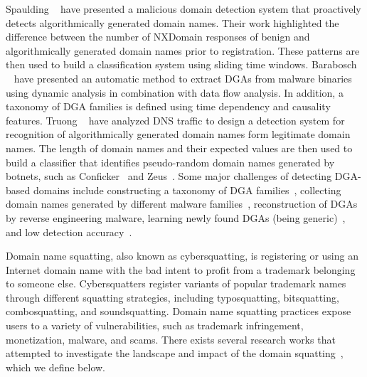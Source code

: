 Spaulding \etal~ have presented a malicious domain detection system that proactively detects algorithmically generated domain names. Their work  highlighted the difference between the number of NXDomain responses of benign and algorithmically generated domain names prior to registration. These patterns are then used to build a classification system using sliding time windows. Barabosch \etal~ have presented an automatic method to extract DGAs from malware binaries using dynamic analysis in combination with data flow analysis. In addition, a taxonomy of DGA families is defined using time dependency and causality features.  
Truong \etal~ have analyzed DNS traffic to design a detection system for recognition of algorithmically generated domain names form legitimate domain names. The length of domain names and their expected values are then used to build a classifier that identifies pseudo-random domain names generated by botnets, such as Conficker~ and Zeus~.
 Some major challenges of detecting DGA-based domains include constructing a taxonomy of DGA families~, collecting domain names generated by different malware families~, reconstruction of DGAs by reverse engineering malware, learning newly found DGAs (being generic)~, and low detection accuracy~.

\label{sec:Squatting}
Domain name squatting, also known as cybersquatting, is registering or using an Internet domain name with the bad intent to profit from a trademark belonging to someone else. Cybersquatters register variants of popular trademark names through different squatting strategies, including typosquatting, bitsquatting, combosquatting, and soundsquatting. Domain name squatting practices expose users to a variety of vulnerabilities, such as trademark infringement, monetization, malware, and scams. There exists several research works that attempted to investigate the landscape and impact of the domain squatting~, which we define below.


